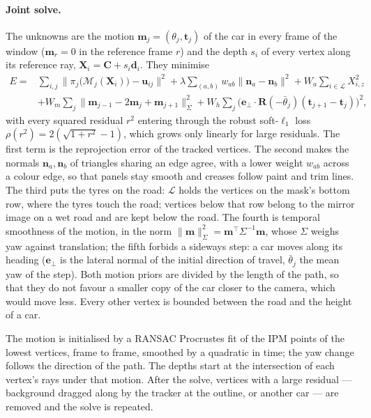 \documentclass[runningheads,a4paper]{llncs}
\newcommand{\vect}[1]{\mathbf{#1}}
\begin{document}
\paragraph{Joint solve.} The unknowns are the motion $\vect{m}_j = (\theta_j, \vect{t}_j)$ of the car in every frame
of the window ($\vect{m}_r = 0$ in the reference frame $r$) and the depth $s_i$ of every vertex along its reference
ray, $\vect{X}_i = \vect{C} + s_i \vect{d}_i$. They minimise
\begin{align}
  E = &\sum_{i,j} \big\| \pi_j\big(\mathcal{M}_j(\vect{X}_i)\big) - \vect{u}_{ij} \big\|^2
      + \lambda \sum_{(a,b)} w_{ab} \|\vect{n}_a - \vect{n}_b\|^2
      + W_a \sum_{i \in \mathcal{L}} X_{i,z}^2 \nonumber\\
      &+ W_m \sum_j \|\vect{m}_{j-1} - 2\vect{m}_j + \vect{m}_{j+1}\|^2_{\Sigma}
      + W_h \sum_j \big( \vect{e}_\perp \cdot \vect{R}(-\bar\theta_j)(\vect{t}_{j+1} - \vect{t}_j) \big)^2 ,
  \label{eq:energy}
\end{align}
with every squared residual $r^2$ entering through the robust soft-$\ell_1$ loss $\rho(r^2) = 2(\sqrt{1 + r^2} - 1)$,
which grows only linearly for large residuals. The first term is the reprojection error of the tracked vertices. The
second makes the normals $\vect{n}_a, \vect{n}_b$ of triangles sharing an edge agree, with a lower weight $w_{ab}$
across a colour edge, so that panels stay smooth and creases follow paint and trim lines. The third puts the tyres on
the road: $\mathcal{L}$ holds the vertices on the mask's bottom row, where the tyres touch the road; vertices below
that row belong to the mirror image on a wet road and are kept below the road. The fourth is temporal smoothness of
the motion, in the norm $\|\vect{m}\|^2_{\Sigma} = \vect{m}^\top \Sigma^{-1} \vect{m}$, whose $\Sigma$ weighs yaw against
translation; the fifth forbids a sideways step: a
car moves along its heading ($\vect{e}_\perp$ is the lateral normal of the initial direction of travel, $\bar\theta_j$
the mean yaw of the step). Both motion priors are divided by the length of the path, so that they do not favour a smaller
copy of the car closer to the camera, which would move less. Every other vertex is bounded between the road and the height of a car.

The motion is initialised by a RANSAC Procrustes fit \cite{fischler_bolles_ransac} of the IPM points of the lowest
vertices, frame to frame, smoothed by a quadratic in time; the yaw change follows the direction of the path. The
depths start at the intersection of each vertex's rays under that motion. After the solve, vertices with a large
residual --- background dragged along by the tracker at the outline, or another car --- are removed and the solve is
repeated.
\end{document}
